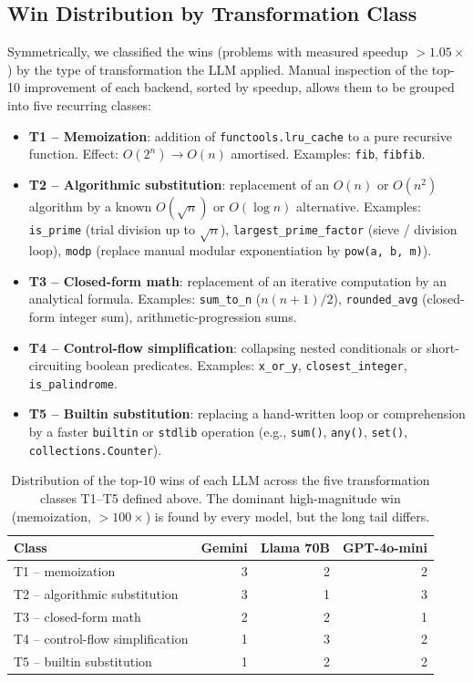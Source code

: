 \documentclass[conference]{IEEEtran}
\begin{document}
\subsection{Win Distribution by Transformation Class}
\label{sec:win_distribution}

Symmetrically, we classified the wins (problems with measured speedup $>1.05\times$) by the type of transformation the LLM applied. Manual inspection of the top-10 improvement of each backend, sorted by speedup, allows them to be grouped into five recurring classes:

\begin{itemize}
  \item \textbf{T1 -- Memoization}: addition of \texttt{functools.lru\_cache} to a pure recursive function. Effect: $O(2^n)\!\to\!O(n)$ amortised. Examples: \texttt{fib}, \texttt{fibfib}.
  \item \textbf{T2 -- Algorithmic substitution}: replacement of an $O(n)$ or $O(n^2)$ algorithm by a known $O(\sqrt{n})$ or $O(\log n)$ alternative. Examples: \texttt{is\_prime} (trial division up to $\sqrt{n}$), \texttt{largest\_prime\_factor} (sieve / division loop), \texttt{modp} (replace manual modular exponentiation by \texttt{pow(a, b, m)}).
  \item \textbf{T3 -- Closed-form math}: replacement of an iterative computation by an analytical formula. Examples: \texttt{sum\_to\_n} ($n(n+1)/2$), \texttt{rounded\_avg} (closed-form integer sum), arithmetic-progression sums.
  \item \textbf{T4 -- Control-flow simplification}: collapsing nested conditionals or short-circuiting boolean predicates. Examples: \texttt{x\_or\_y}, \texttt{closest\_integer}, \texttt{is\_palindrome}.
  \item \textbf{T5 -- Builtin substitution}: replacing a hand-written loop or comprehension by a faster \texttt{builtin} or \texttt{stdlib} operation (e.g., \texttt{sum()}, \texttt{any()}, \texttt{set()}, \texttt{collections.Counter}).
\end{itemize}

\begin{table}[htbp]
\caption{Distribution of the top-10 wins of each LLM across the five transformation classes T1--T5 defined above. The dominant high-magnitude win (memoization, $> 100\times$) is found by every model, but the long tail differs.}
\label{tab:win_classes}
\centering
\footnotesize
\begin{tabular}{lrrr}
\hline
\textbf{Class} & \textbf{Gemini} & \textbf{Llama 70B} & \textbf{GPT-4o-mini} \\
\hline
T1 -- memoization & 3 & 2 & 2 \\
T2 -- algorithmic substitution & 3 & 1 & 3 \\
T3 -- closed-form math & 2 & 2 & 1 \\
T4 -- control-flow simplification & 1 & 3 & 2 \\
T5 -- builtin substitution & 1 & 2 & 2 \\
\hline
\end{tabular}
\end{table}
\end{document}
